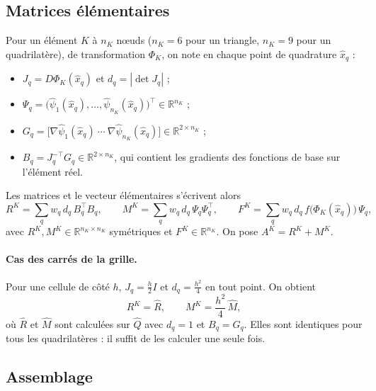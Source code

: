 \documentclass[11pt,a4paper]{article}
\begin{document}
\subsection{Matrices élémentaires}

Pour un élément $K$ à $n_K$ nœuds ($n_K = 6$ pour un triangle,
$n_K = 9$ pour un quadrilatère), de transformation $\Phi_K$, on note en
chaque point de quadrature $\hat{x}_q$ :
\begin{itemize}
  \item $J_q = D\Phi_K(\hat{x}_q)$ et $d_q = |\det J_q|$ ;
  \item $\Psi_q = \big(\widehat{\psi}_1(\hat{x}_q), \dots, \widehat{\psi}_{n_K}(\hat{x}_q)\big)^{\top} \in \mathbb{R}^{n_K}$ ;
  \item $G_q = \big[\nabla\widehat{\psi}_1(\hat{x}_q) \ \cdots\ \nabla\widehat{\psi}_{n_K}(\hat{x}_q)\big] \in \mathbb{R}^{2 \times n_K}$ ;
  \item $B_q = J_q^{-\top} G_q \in \mathbb{R}^{2 \times n_K}$, qui contient
        les gradients des fonctions de base sur l'élément réel.
\end{itemize}
Les matrices et le vecteur élémentaires s'écrivent alors
\[
R^K = \sum_{q} w_q\, d_q\, B_q^{\top} B_q ,
\qquad
M^K = \sum_{q} w_q\, d_q\, \Psi_q \Psi_q^{\top} ,
\qquad
F^K = \sum_{q} w_q\, d_q\, f\big(\Phi_K(\hat{x}_q)\big)\, \Psi_q ,
\]
avec $R^K, M^K \in \mathbb{R}^{n_K \times n_K}$ symétriques et
$F^K \in \mathbb{R}^{n_K}$. On pose $A^K = R^K + M^K$.

\paragraph{Cas des carrés de la grille.} Pour une cellule de côté $h$,
$J_q = \tfrac{h}{2} I$ et $d_q = \tfrac{h^2}{4}$ en tout point. On obtient
\[
R^K = \widehat{R}, \qquad M^K = \frac{h^2}{4}\, \widehat{M},
\]
où $\widehat{R}$ et $\widehat{M}$ sont calculées sur $\widehat{Q}$ avec
$d_q = 1$ et $B_q = G_q$. Elles sont identiques pour tous les
quadrilatères : il suffit de les calculer une seule fois.

\subsection{Assemblage}
\end{document}
